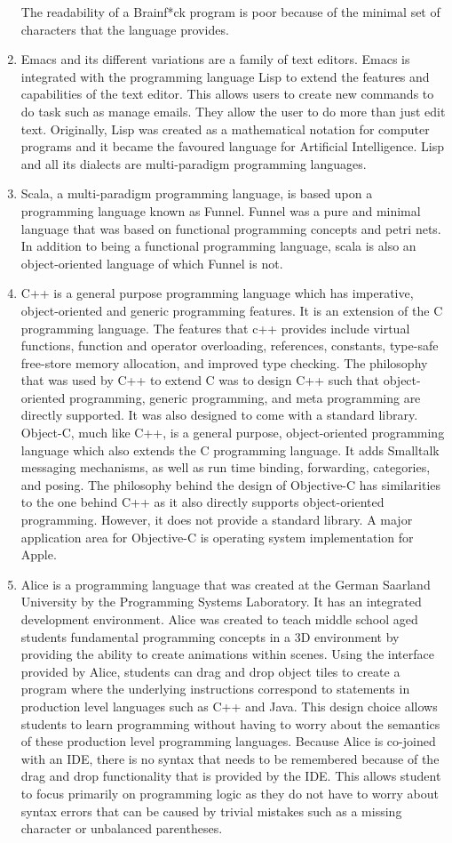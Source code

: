 \documentclass{article}
\begin{document}
\begin{enumerate}
    The readability of a Brainf*ck program is poor because of the minimal set of characters that the language provides.
    \item Emacs and its different variations are a family of text editors. Emacs is integrated with the programming language Lisp to extend the features and capabilities of the text editor. This allows users to create new commands to do task such as manage emails. They allow the user to do more than just edit text. Originally, Lisp was created as a mathematical notation for computer programs and it became the favoured language for Artificial Intelligence. Lisp and all its dialects are multi-paradigm programming languages.
    \item Scala, a multi-paradigm programming language, is based upon a programming language known as Funnel. Funnel was a pure and minimal language that was based on functional programming concepts and petri nets. In addition to being a functional programming language, scala is also an object-oriented language of which Funnel is not.
    \item C++ is a general purpose programming language which has imperative, object-oriented and generic programming features. It is an extension of the C programming language. The features that c++ provides include virtual functions, function and operator overloading, references, constants, type-safe free-store memory allocation, and improved type checking. The philosophy that was used by C++ to extend C was to design C++ such that object-oriented programming, generic programming, and meta programming are directly supported. It was also designed to come with a standard library.\\Object-C, much like C++, is a general purpose, object-oriented programming language which also extends the C programming language. It adds Smalltalk messaging mechanisms, as well as run time binding, forwarding, categories, and posing. The philosophy behind the design of Objective-C has similarities to the one behind C++ as it also directly supports object-oriented programming. However, it does not provide a standard library. A major application area for Objective-C is operating system implementation for Apple.
    \item Alice is a programming language that was created at the German Saarland University by the Programming Systems Laboratory. It has an integrated development environment. Alice was created to teach middle school aged students fundamental programming concepts in a 3D environment by providing the ability to create animations within scenes. Using the interface provided by Alice, students can drag and drop object tiles to create a program where the underlying instructions correspond to statements in production level languages such as C++ and Java. This design choice allows students to learn programming without having to worry about the semantics of these production level programming languages. Because Alice is co-joined with an IDE, there is no syntax that needs to be remembered because of the drag and drop functionality that is provided by the IDE. This allows student to focus primarily on programming logic as they do not have to worry about syntax errors that can be caused by trivial mistakes such as a missing character or unbalanced parentheses.

\end{enumerate}
\end{document}
